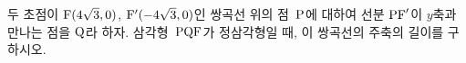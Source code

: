 두 초점이 $\mathrm{F}(4\sqrt{3}{,}\mkern3mu\mathopen{}0)$, $\mathrm{F}'(-4\sqrt{3}{,}\mkern3mu\mathopen{}0)$인 쌍곡선 위의 점~$\mathrm{P}$에 대하여 선분 $\mathrm{PF}'$이 $y$축과 만나는 점을 $\mathrm{Q}$라 하자. 삼각형~$\mathrm{PQF}$가 정삼각형일 때, 이 쌍곡선의 주축의 길이를 구하시오. 
